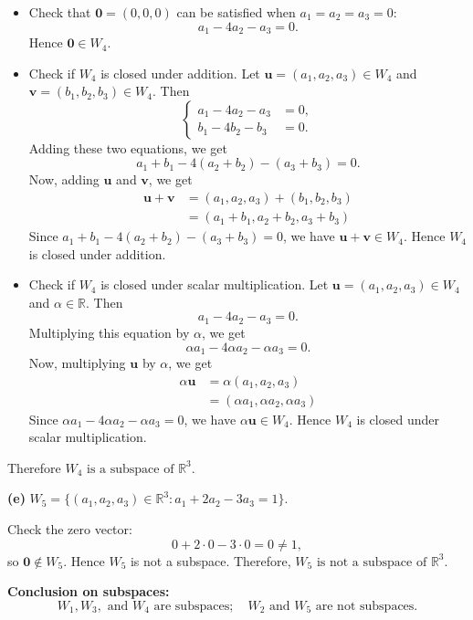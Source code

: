 \documentclass{article}
\begin{document}
\begin{itemize}
\item Check that $\mathbf{0} = (0,0,0)$ can be satisfied when $a_1 = a_2 = a_3 = 0$:
\[
a_1 - 4a_2 - a_3 = 0.
\]
Hence $\mathbf{0} \in W_4$.

\item Check if $W_4$ is closed under addition. Let $\mathbf{u} = (a_1,a_2,a_3) \in W_4$ and $\mathbf{v} = (b_1,b_2,b_3) \in W_4$. Then
\[
\left\{\begin{aligned}
a_1 - 4a_2 - a_3 &= 0, \\
b_1 - 4b_2 - b_3 &= 0.
\end{aligned}\right.
\]
Adding these two equations, we get
\[
a_1 + b_1 - 4(a_2 + b_2) - (a_3 + b_3) = 0.
\]
Now, adding $\mathbf{u}$ and $\mathbf{v}$, we get
\begin{align*}
\mathbf{u} + \mathbf{v} &= (a_1, a_2, a_3) + (b_1, b_2, b_3) \\
&= (a_1 + b_1, a_2 + b_2, a_3 + b_3)
\end{align*}
Since $a_1 + b_1 - 4(a_2 + b_2) - (a_3 + b_3) = 0$, we have $\mathbf{u} + \mathbf{v} \in W_4$. Hence $W_4$ is closed under addition.

\item Check if $W_4$ is closed under scalar multiplication. Let $\mathbf{u} = (a_1,a_2,a_3) \in W_4$ and $\alpha \in \mathbb{R}$. Then
\[
a_1 - 4a_2 - a_3 = 0.
\]
Multiplying this equation by $\alpha$, we get
\[
\alpha a_1 - 4\alpha a_2 - \alpha a_3 = 0.
\]
Now, multiplying $\mathbf{u}$ by $\alpha$, we get
\begin{align*}
\alpha \mathbf{u} &= \alpha (a_1, a_2, a_3) \\
&= (\alpha a_1, \alpha a_2, \alpha a_3)
\end{align*}
Since $\alpha a_1 - 4\alpha a_2 - \alpha a_3 = 0$, we have $\alpha \mathbf{u} \in W_4$. Hence $W_4$ is closed under scalar multiplication.
\end{itemize}

Therefore $W_4 \text{ is a subspace of } \mathbb{R}^3$.

\bigskip

\noindent
\textbf{(e)} $W_5 = \{(a_1,a_2,a_3) \in \mathbb{R}^3 : a_1 + 2a_2 - 3a_3 = 1\}$.

Check the zero vector:
\[
0 + 2\cdot0 - 3\cdot0 = 0 \neq 1,
\]
so $\mathbf{0}\notin W_5$. Hence $W_5$ is not a subspace. Therefore, $W_5 \text{ is not a subspace of } \mathbb{R}^3$.

\bigskip

\noindent
\textbf{Conclusion on subspaces:}
\[
W_1, W_3, \text{ and } W_4 \text{ are subspaces}; \quad W_2 \text{ and } W_5 \text{ are not subspaces.}
\]
\end{document}

